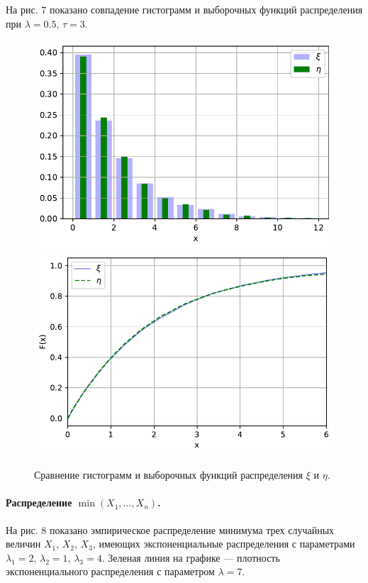 \documentclass[16pt]{article}
\begin{document}
На рис. 7 показано совпадение гистограмм и выборочных функций распределения при $\lambda = 0.5, \, \tau = 3$.
\begin{figure}[h]
	\center
    \includegraphics[scale=0.5]{3_1.pdf}
    \hfill
    \includegraphics[scale=0.5]{3_2.pdf}
    \caption{Сравнение гистограмм и выборочных функций распределения $\xi$ и $\eta$.}
\end{figure}

\paragraph{Распределение $\min(X_1,\ldots, X_n)$.} 
На рис. 8 показано эмпирическое распределение минимума трех случайных величин $X_1,\, X_2,\, X_3$, имеющих экспоненциальные распределения с параметрами $\lambda_1 = 2,\, \lambda_2 = 1,\, \lambda_3 = 4$. Зеленая линия на графике --- плотность экспоненциального распределения с параметром $\lambda = 7$.
\end{document}
